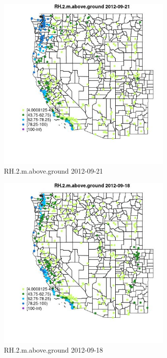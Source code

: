 \begin{figure} 
\centering  
\includegraphics[width=0.77\textwidth]{Code_Outputs/Report_ML_input_PM25_Step4_part_e_de_duplicated_aves_compiled_2019-05-14wNAs_MapObsRH2maboveground2012-09-21.jpg} 
\caption{\label{fig:Report_ML_input_PM25_Step4_part_e_de_duplicated_aves_compiled_2019-05-14wNAsMapObsRH2maboveground2012-09-21}RH.2.m.above.ground 2012-09-21} 
\end{figure} 
 

\clearpage 

\begin{figure} 
\centering  
\includegraphics[width=0.77\textwidth]{Code_Outputs/Report_ML_input_PM25_Step4_part_e_de_duplicated_aves_compiled_2019-05-14wNAs_MapObsRH2maboveground2012-09-18.jpg} 
\caption{\label{fig:Report_ML_input_PM25_Step4_part_e_de_duplicated_aves_compiled_2019-05-14wNAsMapObsRH2maboveground2012-09-18}RH.2.m.above.ground 2012-09-18} 
\end{figure} 
 

